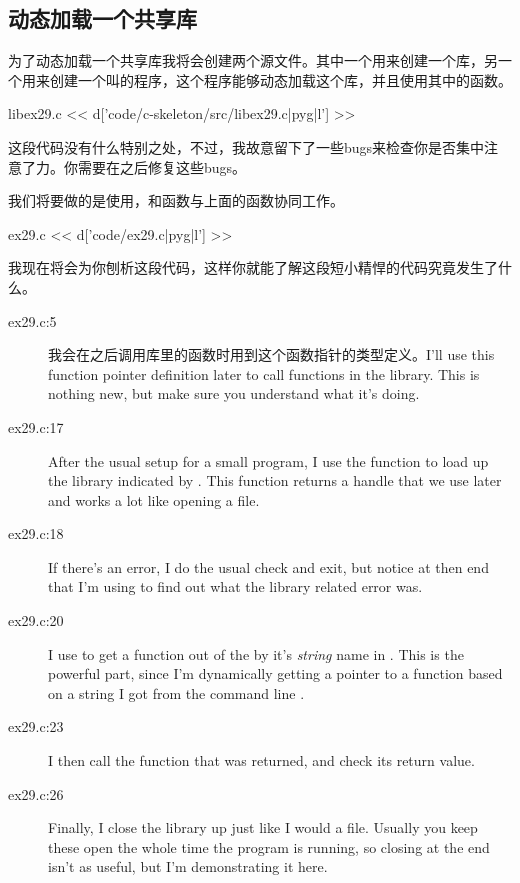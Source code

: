 \subsection{动态加载一个共享库}

为了动态加载一个共享库我将会创建两个源文件。其中一个用来创建一个库，另一个用来创建一个叫的程序，这个程序能够动态加载这个库，并且使用其中的函数。

\begin{code}{libex29.c}
<< d['code/c-skeleton/src/libex29.c|pyg|l'] >>
\end{code}

这段代码没有什么特别之处，不过，我故意留下了一些bugs来检查你是否集中注意了力。你需要在之后修复这些bugs。

我们将要做的是使用，和函数与上面的函数协同工作。

\begin{code}{ex29.c}
<< d['code/ex29.c|pyg|l'] >>
\end{code}

我现在将会为你刨析这段代码，这样你就能了解这段短小精悍的代码究竟发生了什么。

\begin{description}
\item[ex29.c:5] 我会在之后调用库里的函数时用到这个函数指针的类型定义。I'll use this function pointer definition later to call functions
    in the library.  This is nothing new, but make sure you understand what
    it's doing.
\item[ex29.c:17] After the usual setup for a small program, I use the 
    function to load up the library indicated by .  This function
    returns a handle that we use later and works a lot like opening a file.
\item[ex29.c:18] If there's an error, I do the usual check and exit, but notice at
    then end that I'm using  to find out what the library related
    error was.
\item[ex29.c:20] I use  to get a function out of the  
    by it's \emph{string} name in .  This is the powerful
    part, since I'm dynamically getting a pointer to a function based on a
    string I got from the command line .
\item[ex29.c:23] I then call the  function that was returned, and 
    check its return value.
\item[ex29.c:26] Finally, I close the library up just like I would a file.  Usually
    you keep these open the whole time the program is running, so closing at
    the end isn't as useful, but I'm demonstrating it here.
\end{description}

